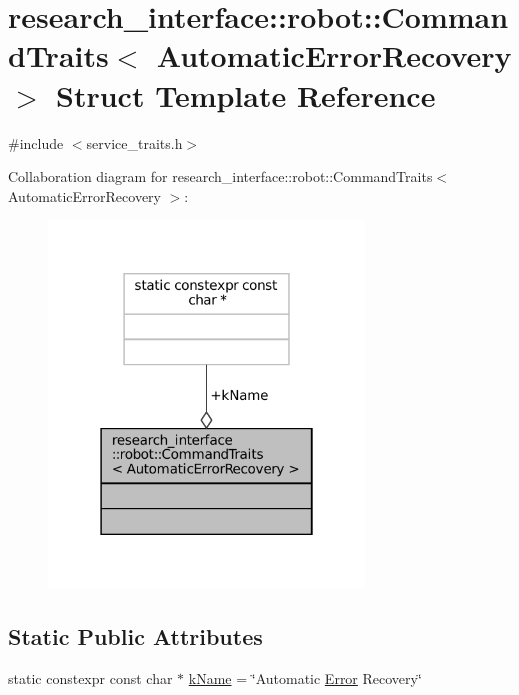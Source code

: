 \hypertarget{structresearch__interface_1_1robot_1_1CommandTraits_3_01AutomaticErrorRecovery_01_4}{}\section{research\+\_\+interface\+:\+:robot\+:\+:Command\+Traits$<$ Automatic\+Error\+Recovery $>$ Struct Template Reference}
\label{structresearch__interface_1_1robot_1_1CommandTraits_3_01AutomaticErrorRecovery_01_4}


{\ttfamily \#include $<$service\+\_\+traits.\+h$>$}



Collaboration diagram for research\+\_\+interface\+:\+:robot\+:\+:Command\+Traits$<$ Automatic\+Error\+Recovery $>$\+:
\nopagebreak
\begin{figure}[H]
\begin{center}
\leavevmode
\includegraphics[width=238pt]{structresearch__interface_1_1robot_1_1CommandTraits_3_01AutomaticErrorRecovery_01_4__coll__graph}
\end{center}
\end{figure}
\subsection*{Static Public Attributes}
\begin{DoxyCompactItemize}
\item 
static constexpr const char $\ast$ \hyperlink{structresearch__interface_1_1robot_1_1CommandTraits_3_01AutomaticErrorRecovery_01_4_a0777fcccbd0b9673cd03d0951191de1e}{k\+Name} = \char`\"{}Automatic \hyperlink{namespaceresearch__interface_1_1robot_a32c6a50656f8b9130114ad84bdde7589}{Error} Recovery\char`\"{}
\end{DoxyCompactItemize}


